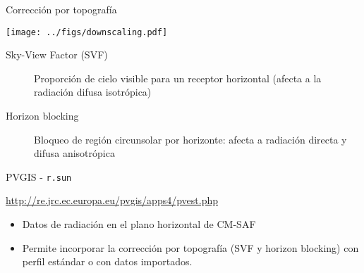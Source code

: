 \documentclass[aspectratio=169, usenames,svgnames,dvipsnames]{beamer}
\begin{document}
\begin{frame}[label={sec:orgd321b16}]{Corrección por topografía}
\begin{center}
\begin{center}
\texttt{[image: ../figs/downscaling.pdf]}
\end{center}
\end{center}

\begin{description}
\item[{Sky-View Factor (SVF)}] Proporción de cielo visible para un receptor horizontal (afecta a la radiación difusa isotrópica)

\item[{Horizon blocking}] Bloqueo de región circunsolar por horizonte: afecta a radiación directa y difusa anisotrópica
\end{description}


\nocite{Bosch.Batlles.ea2010}
\nocite{Tovar-Pescador.Pozo-Vazquez.ea2006}
\nocite{Antonanzas-Torres.MartinezdePison.ea2013}
\nocite{Hofierka.Suri2002}
\end{frame}

\begin{frame}[label={sec:orga694426},fragile]{PVGIS - \texttt{r.sun}}
 \begin{block}{\url{http://re.jrc.ec.europa.eu/pvgis/apps4/pvest.php}}
\begin{itemize}
\item Datos de radiación en el plano horizontal de CM-SAF
\item Permite incorporar la corrección por topografía (SVF y horizon blocking) con perfil estándar o con datos importados.
\end{itemize}
\end{block}
\end{frame}
\end{document}
